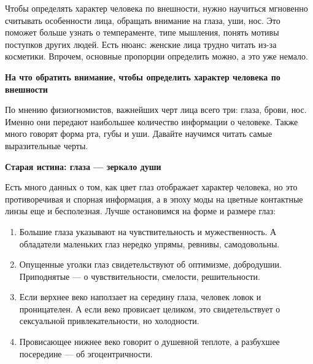 Чтобы определять характер человека по внешности, нужно научиться мгновенно считывать особенности лица, обращать внимание на глаза, уши, нос. Это поможет больше узнать о темпераменте, типе мышления, понять мотивы поступков других людей. Есть нюанс: женские лица трудно читать из-за косметики. Впрочем, основные пропорции определить можно, а это уже немало.

\textbf{На что обратить внимание, чтобы определить характер человека по внешности}

По мнению физиогномистов, важнейших черт лица всего три: глаза, брови, нос. Именно они передают наибольшее количество информации о человеке. Также много говорят форма рта, губы и уши. Давайте научимся читать самые выразительные черты.

\textbf{Старая истина: глаза — зеркало души}

Есть много данных о том, как цвет глаз отображает характер человека, но это противоречивая и спорная информация, а в эпоху моды на цветные контактные линзы еще и бесполезная. Лучше остановимся на форме и размере глаз:

\begin{enumerate}
    \item Большие глаза указывают на чувствительность и мужественность. А обладатели маленьких глаз нередко упрямы, ревнивы, самодовольны.
    \item Опущенные уголки глаз свидетельствуют об оптимизме, добродушии. Приподнятые — о чувствительности, смелости, решительности.
    \item Если верхнее веко наползает на середину глаза, человек ловок и проницателен. А если веко провисает целиком, это свидетельствует о сексуальной привлекательности, но холодности.
    \item Провисающее нижнее веко говорит о душевной теплоте, а разбухшее посередине — об эгоцентричности.
\end{enumerate}

